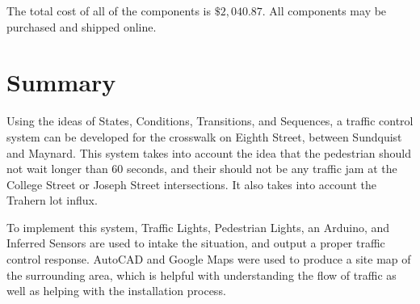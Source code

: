\documentclass{article}
\begin{document}
The total cost of all of the components is $ \$2,040.87$. All components may be purchased and shipped online. 

\section{Summary}
Using the ideas of States, Conditions, Transitions, and Sequences, a traffic control system can be developed for the crosswalk on Eighth Street, between Sundquist and Maynard. This system takes into account the idea that the pedestrian should not wait longer than 60 seconds, and their should not be any traffic jam at the College Street or Joseph Street intersections. It also takes into account the Trahern lot influx.

To implement this system, Traffic Lights, Pedestrian Lights, an Arduino, and Inferred Sensors are used to intake the situation, and output a proper traffic control response. AutoCAD and Google Maps were used to produce a site map of the surrounding area, which is helpful with understanding the flow of traffic as well as helping with the installation process.
\end{document}
